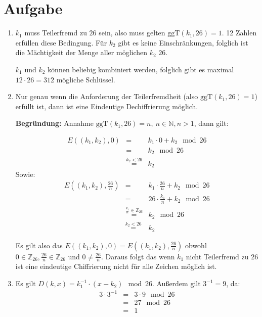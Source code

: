 \documentclass[DIN, pagenumber=false, fontsize=11pt, parskip=half]{scrartcl}
\begin{document}
    \section{Aufgabe}
    \begin{enumerate}[label=(\roman*)]
        \item $k_1$ muss Teilerfremd zu $26$ sein, also muss gelten $\text{ggT}(k_1, 26) = 1$. 
            12 Zahlen erfüllen diese Bedingung. Für $k_2$ gibt es keine Einschränkungen, folglich ist die Mächtigkeit der Menge aller möglichen $k_2$ $26$.

            $k_1$ und $k_2$ können beliebig kombiniert werden, folglich gibt es maximal $12 \cdot 26 = 312$ mögliche Schlüssel.
        \item Nur genau wenn die Anforderung der Teilerfremdheit 
            (also $\text{ggT}(k_1, 26) = 1$) erfüllt ist, dann ist eine Eindeutige
            Dechiffrierung möglich.

            \textbf{Begründung:} Annahme 
            $\text{ggT}(k_1, 26) = n,\ n \in \mathbb{N}, n > 1$, dann gilt:
            
            \begin{eqnarray*}
                E\left((k_1, k_2), 0\right) &=& k_1 \cdot 0 +k_2 \mod 26 \\
                    &=& k_2 \mod 26 \\
                    &\stackrel{k_2 < 26}{=}& k_2 
            \end{eqnarray*}
            Sowie:
            \begin{eqnarray*}
                E\left((k_1, k_2), \frac{26}{n}\right) &=& k_1 \cdot \frac{26}{n} + k_2 \mod 26 \\
                    &=& 26 \cdot \frac{k_1}{n} + k_2 \mod 26  \\
                    &\stackrel{\frac{k_1}{n} \in \mathbb{Z}_{26}}{=}& k_2 \mod 26 \\
                    &\stackrel{k_2 < 26}{=}& k_2 
            \end{eqnarray*}

            Es gilt also das $E\left((k_1, k_2), 0\right) = E\left((k_1, k_2), \frac{26}{n}\right)$ 
            obwohl $0 \in \mathbb{Z}_{26}, \frac{26}{n} \in \mathbb{Z}_{26}$ und $0 \neq \frac{26}{n}$. Daraus folgt das wenn $k_1$ nicht Teilerfremd zu 26 ist eine eindeutige Chiffrierung nicht für alle Zeichen möglich ist.
        \item Es gilt $D(k, x) = k_1^{-1} \cdot (x - k_2) \mod 26$.
            Außerdem gilt $3^{-1} = 9$, da:
            \begin{eqnarray*}
                3 \cdot 3^{-1} &=& 3 \cdot 9 \mod 26 \\
                    &=& 27 \mod 26 \\
                    &=& 1
            \end{eqnarray*}


\end{enumerate}
\end{document}
